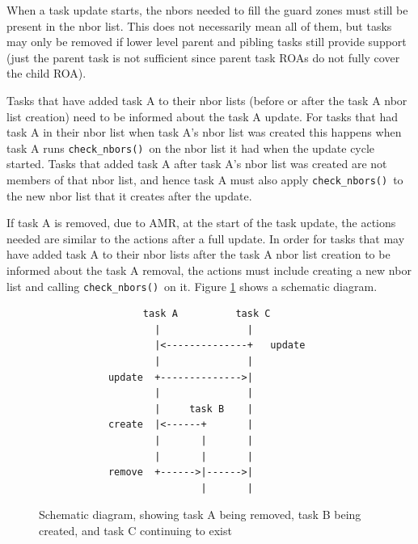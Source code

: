 \documentclass[paper=a4,fontsize=11pt]{scrartcl}
\numberwithin{equation}{section}		%
\numberwithin{figure}{section}			%
\numberwithin{table}{section}				%
\newcommand{\codecolor}{\color{Blue}}
\newcommand{\Code}[1]{{\codecolor\texttt{#1}}}
\def\checknbors{\Code{check\_nbors()}}
\begin{document}
When a task update starts, the nbors needed to fill the guard zones must still be present in the nbor list.  This does not necessarily mean all of them, but tasks may only be removed if lower level parent and pibling tasks still provide support (just the parent task is not sufficient since parent task ROAs do not fully cover the child ROA).

Tasks that have added task A to their nbor lists (before or after the task A nbor list creation) need to be informed about the task A update.  For tasks that had task A in their nbor list when task A's nbor list was created this happens when task A runs \checknbors\ on the nbor list it had when the update cycle started.   Tasks that added task A after task A's nbor list was created are not members of that nbor list, and hence task A must also apply \checknbors\ to the new nbor list that it creates after the update.

If task A is removed, due to AMR, at the start of the task update, the actions needed are similar to the actions after a full update.  In order for tasks that may have added task A to their nbor lists after the task A nbor list creation to be informed about the task A removal, the actions must include creating a new nbor list and calling \checknbors\ on it.  Figure \ref{fig:nbor-lists} shows a schematic diagram.

\begin{figure}[t]
{\small\codecolor\begin{verbatim}
                  task A          task C
                    |               |
                    |<--------------+   update
                    |               |
            update  +-------------->|
                    |               |
                    |     task B    |
            create  |<------+       |
                    |       |       |
                    |       |       |
            remove  +------>|------>|
                            |       |
            \end{verbatim}}
    \caption{Schematic diagram, showing task A being removed, task B being created, and task C continuing to exist}
    \label{fig:nbor-lists}
\end{figure}

\end{document}
